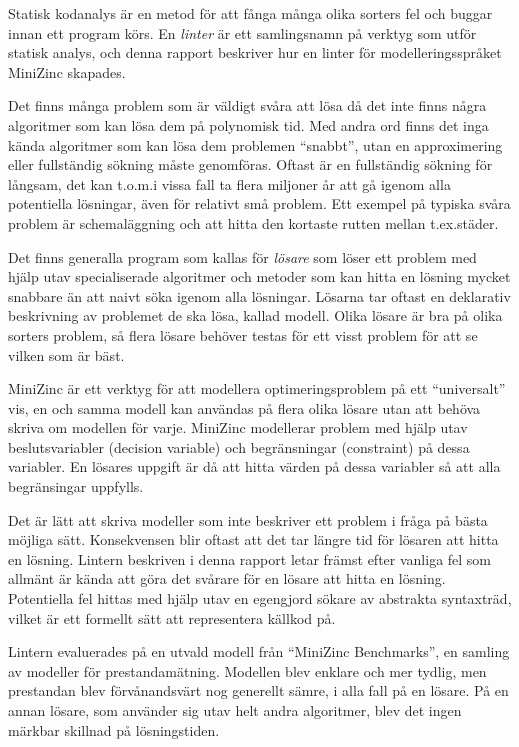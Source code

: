 \documentclass[a4paper,12pt]{article}
\begin{document}
\begin{sammanfattning}
Statisk kodanalys är en metod för att fånga många olika sorters fel och buggar innan
ett program körs. En \emph{linter} är ett samlingsnamn på verktyg som utför
statisk analys, och denna rapport beskriver hur en linter för modelleringsspråket MiniZinc
skapades.

Det finns många problem som är väldigt svåra att lösa då det inte finns några algoritmer
som kan lösa dem på polynomisk tid. Med andra ord finns det inga kända algoritmer som kan lösa
dem problemen ``snabbt'', utan en approximering eller fullständig sökning måste genomföras.
Oftast är en fullständig sökning för långsam, det kan t.o.m.\@ i vissa fall ta flera miljoner år att gå
igenom alla potentiella lösningar, även för relativt små problem.
Ett exempel på typiska svåra problem är schemaläggning och att hitta den kortaste rutten
mellan t.ex.\@ städer.

Det finns generalla program som kallas för \emph{lösare} som löser ett problem med hjälp
utav specialiserade algoritmer och metoder som kan hitta en lösning mycket snabbare än att
naivt söka igenom alla lösningar. Lösarna tar oftast en deklarativ beskrivning
av problemet de ska lösa, kallad modell. Olika lösare är bra på olika sorters problem, så
flera lösare behöver testas för ett visst problem för att se vilken som är bäst.

MiniZinc är ett verktyg för att modellera optimeringsproblem på ett ``universalt'' vis, en
och samma modell kan användas på flera olika lösare utan att behöva skriva om modellen för
varje. MiniZinc modellerar problem med hjälp utav beslutsvariabler (decision
variable) och begränsningar (constraint) på dessa variabler. En lösares uppgift är då att
hitta värden på dessa variabler så att alla begränsingar uppfylls.

Det är lätt att skriva modeller som inte beskriver ett problem i fråga på bästa möjliga
sätt. Konsekvensen blir oftast att det tar längre tid för lösaren att hitta en lösning.
Lintern beskriven i denna rapport letar främst efter vanliga fel som allmänt är kända att
göra det svårare för en lösare att hitta en lösning. Potentiella fel hittas med hjälp utav
en egengjord sökare av abstrakta syntaxträd, vilket är ett formellt sätt att representera källkod på.

Lintern evaluerades på en utvald modell från ``MiniZinc Benchmarks'', en samling av
modeller för prestandamätning. Modellen blev enklare och mer tydlig, men prestandan blev
förvånandsvärt nog generellt sämre, i alla fall på en lösare. På en annan lösare, som
använder sig utav helt andra algoritmer, blev det ingen märkbar skillnad på lösningstiden.
\end{sammanfattning}
\end{document}
